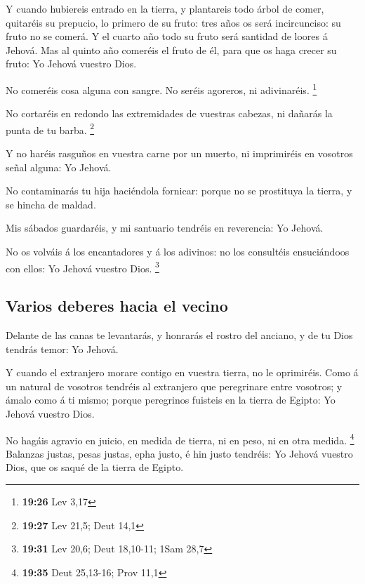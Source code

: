  Y cuando hubiereis entrado en la tierra, y plantareis todo
árbol de comer, quitaréis su prepucio, lo primero de su fruto: tres años
os será incircunciso: su fruto no se comerá.  Y el cuarto
año todo su fruto será santidad de loores á Jehová.  Mas al
quinto año comeréis el fruto de él, para que os haga crecer su fruto: Yo
Jehová vuestro Dios.

 No comeréis cosa alguna con sangre. No seréis agoreros, ni
adivinaréis. \footnote{\textbf{19:26} Lev 3,17}

 No cortaréis en redondo las extremidades de vuestras
cabezas, ni dañarás la punta de tu barba. \footnote{\textbf{19:27} Lev
  21,5; Deut 14,1}

 Y no haréis rasguños en vuestra carne por un muerto, ni
imprimiréis en vosotros señal alguna: Yo Jehová.

 No contaminarás tu hija haciéndola fornicar: porque no se
prostituya la tierra, y se hincha de maldad.

 Mis sábados guardaréis, y mi santuario tendréis en
reverencia: Yo Jehová.

 No os volváis á los encantadores y á los adivinos: no los
consultéis ensuciándoos con ellos: Yo Jehová vuestro Dios. \footnote{\textbf{19:31}
  Lev 20,6; Deut 18,10-11; 1Sam 28,7}

\hypertarget{varios-deberes-hacia-el-vecino}{%
\subsection{Varios deberes hacia el
vecino}\label{varios-deberes-hacia-el-vecino}}

 Delante de las canas te levantarás, y honrarás el rostro
del anciano, y de tu Dios tendrás temor: Yo Jehová.

 Y cuando el extranjero morare contigo en vuestra tierra,
no le oprimiréis.  Como á un natural de vosotros tendréis
al extranjero que peregrinare entre vosotros; y ámalo como á ti mismo;
porque peregrinos fuisteis en la tierra de Egipto: Yo Jehová vuestro
Dios.

 No hagáis agravio en juicio, en medida de tierra, ni en
peso, ni en otra medida. \footnote{\textbf{19:35} Deut 25,13-16; Prov
  11,1}  Balanzas justas, pesas justas, epha justo, é hin
justo tendréis: Yo Jehová vuestro Dios, que os saqué de la tierra de
Egipto.

